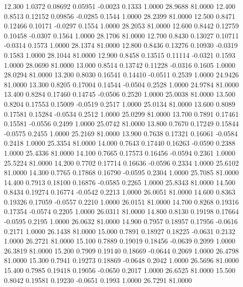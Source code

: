   12.300   1.0372   0.08692   0.05951  -0.0023   0.1333   1.0000  28.9688  81.0000
  12.400   0.8513   0.12152   0.09856  -0.0285   0.1544   1.0000  28.2399  81.0000
  12.500   0.8471   0.12466   0.10171  -0.0297   0.1554   1.0000  28.2053  81.0000
  12.600   0.8442   0.12759   0.10458  -0.0307   0.1564   1.0000  28.1706  81.0000
  12.700   0.8430   0.13027   0.10711  -0.0314   0.1573   1.0000  28.1374  81.0000
  12.800   0.8436   0.13276   0.10930  -0.0319   0.1583   1.0000  28.1044  81.0000
  12.900   0.8458   0.13515   0.11114  -0.0321   0.1593   1.0000  28.0690  81.0000
  13.000   0.8514   0.13742   0.11228  -0.0316   0.1605   1.0000  28.0294  81.0000
  13.200   0.8030   0.16541   0.14410  -0.0511   0.2539   1.0000  24.9426  81.0000
  13.300   0.8205   0.17004   0.14544  -0.0504   0.2528   1.0000  24.9784  81.0000
  13.400   0.8284   0.17460   0.14745  -0.0506   0.2520   1.0000  25.0038  81.0000
  13.500   0.8204   0.17553   0.15009  -0.0519   0.2517   1.0000  25.0134  81.0000
  13.600   0.8089   0.17581   0.15284  -0.0534   0.2512   1.0000  25.0299  81.0000
  13.700   0.7891   0.17461   0.15581  -0.0556   0.2499   1.0000  25.0742  81.0000
  13.800   0.7670   0.17249   0.15844  -0.0575   0.2455   1.0000  25.2169  81.0000
  13.900   0.7638   0.17321   0.16061  -0.0584   0.2418   1.0000  25.3354  81.0000
  14.000   0.7643   0.17440   0.16263  -0.0590   0.2388   1.0000  25.4336  81.0000
  14.100   0.7665   0.17573   0.16456  -0.0594   0.2361   1.0000  25.5224  81.0000
  14.200   0.7702   0.17714   0.16636  -0.0596   0.2334   1.0000  25.6102  81.0000
  14.300   0.7765   0.17868   0.16790  -0.0595   0.2304   1.0000  25.7085  81.0000
  14.400   0.7913   0.18100   0.16876  -0.0585   0.2265   1.0000  25.8343  81.0000
  14.500   0.8434   0.19274   0.16774  -0.0542   0.2213   1.0000  26.0051  81.0000
  14.600   0.8363   0.19326   0.17059  -0.0557   0.2210   1.0000  26.0151  81.0000
  14.700   0.8268   0.19316   0.17354  -0.0574   0.2205   1.0000  26.0311  81.0000
  14.800   0.8130   0.19198   0.17664  -0.0595   0.2195   1.0000  26.0632  81.0000
  14.900   0.7957   0.18957   0.17956  -0.0616   0.2171   1.0000  26.1438  81.0000
  15.000   0.7891   0.18927   0.18225  -0.0631   0.2132   1.0000  26.2721  81.0000
  15.100   0.7889   0.19019   0.18456  -0.0639   0.2099   1.0000  26.3819  81.0000
  15.200   0.7909   0.19140   0.18669  -0.0644   0.2069   1.0000  26.4798  81.0000
  15.300   0.7941   0.19273   0.18869  -0.0648   0.2042   1.0000  26.5696  81.0000
  15.400   0.7985   0.19418   0.19056  -0.0650   0.2017   1.0000  26.6525  81.0000
  15.500   0.8042   0.19581   0.19230  -0.0651   0.1993   1.0000  26.7291  81.0000
